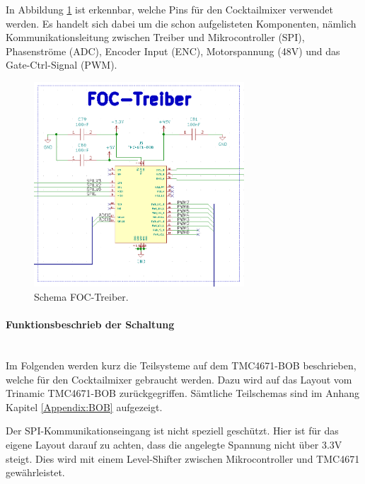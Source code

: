 In Abbildung \ref{fig:Schema_FOC_Treiber} ist erkennbar, welche Pins für den Cocktailmixer verwendet werden. Es handelt sich dabei um die schon aufgelisteten Komponenten, nämlich Kommunikationsleitung zwischen Treiber und Mikrocontroller (SPI), Phasenströme (ADC), Encoder Input (ENC), Motorspannung (48V) und das Gate-Ctrl-Signal (PWM).

\begin{figure}[H]
	\centering
	\includegraphics[width=0.7\textwidth]{graphics/Schema_FOC_Treiber}
	\caption{Schema FOC-Treiber.}
	\label{fig:Schema_FOC_Treiber}
\end{figure} 

\paragraph{Funktionsbeschrieb der Schaltung}\mbox{}\\

Im Folgenden werden kurz die Teilsysteme auf dem TMC4671-BOB beschrieben, welche für den Cocktailmixer gebraucht werden. Dazu wird auf das Layout vom Trinamic TMC4671-BOB zurückgegriffen. Sämtliche Teilschemas sind im Anhang Kapitel \ref{Appendix:BOB} aufgezeigt. \cite{trinamicmotion_control_gmbh__co_kg_tmc4671-bob_2020}


Der SPI-Kommunikationseingang ist nicht speziell geschützt. Hier ist für das eigene Layout darauf zu achten, dass die angelegte Spannung nicht über 3.3V steigt. Dies wird mit einem Level-Shifter zwischen Mikrocontroller und TMC4671 gewährleistet.


